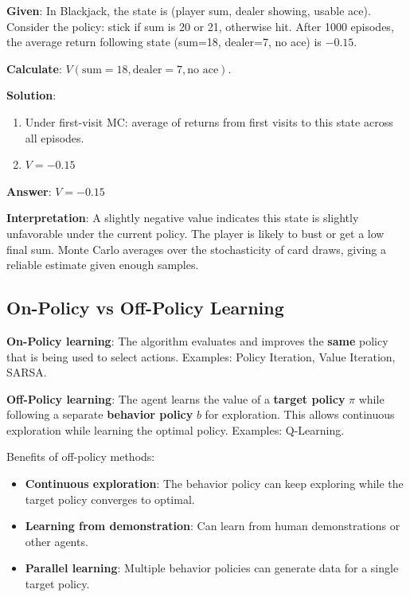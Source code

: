 \documentclass[11pt,a4paper]{article}
\begin{document}
\begin{tcolorbox}[colback=green!5!white,colframe=green!75!black,title=\textbf{Worked Example 30: Blackjack State Value}]
\textbf{Given}: In Blackjack, the state is (player sum, dealer showing, usable ace). Consider the policy: stick if sum is 20 or 21, otherwise hit. After 1000 episodes, the average return following state (sum=18, dealer=7, no ace) is $-0.15$.

\textbf{Calculate}: $V(\text{sum}=18, \text{dealer}=7, \text{no ace})$.

\textbf{Solution}:
\begin{enumerate}
    \item Under first-visit MC: average of returns from first visits to this state across all episodes.
    \item $V = -0.15$
\end{enumerate}

\textbf{Answer}: $V = -0.15$

\textbf{Interpretation}: A slightly negative value indicates this state is slightly unfavorable under the current policy. The player is likely to bust or get a low final sum. Monte Carlo averages over the stochasticity of card draws, giving a reliable estimate given enough samples.
\end{tcolorbox}

\subsection{On-Policy vs Off-Policy Learning}

\textbf{On-Policy learning}: The algorithm evaluates and improves the \textbf{same} policy that is being used to select actions. Examples: Policy Iteration, Value Iteration, SARSA.

\textbf{Off-Policy learning}: The agent learns the value of a \textbf{target policy} $\pi$ while following a separate \textbf{behavior policy} $b$ for exploration. This allows continuous exploration while learning the optimal policy. Examples: Q-Learning.

Benefits of off-policy methods:
\begin{itemize}
    \item \textbf{Continuous exploration}: The behavior policy can keep exploring while the target policy converges to optimal.
    \item \textbf{Learning from demonstration}: Can learn from human demonstrations or other agents.
    \item \textbf{Parallel learning}: Multiple behavior policies can generate data for a single target policy.
\end{itemize}
\end{document}
